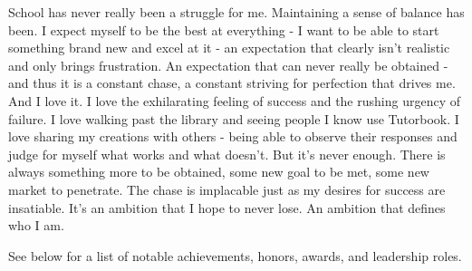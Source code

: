 \begin{cvparagraph}
School has never really been a struggle for me. Maintaining a sense of
	balance has been. I expect myself to be the best at everything - I want to be
	able to start something brand new and excel at it - an expectation that
	clearly isn't realistic and only brings frustration. An expectation that
	can never really be obtained - and thus it is a constant chase, a
	constant striving for perfection that drives me. And I love it. I love
	the exhilarating feeling of success and the rushing urgency of failure.
	I love walking past the library and seeing people I know use Tutorbook.
	I love sharing my creations with others - being able to observe their
	responses and judge for myself what works and what doesn't. But it's
	never enough. There is always something more to be obtained, some new
	goal to be met, some new market to penetrate. The chase is implacable
	just as my desires for success are insatiable. It's an ambition that I
	hope to never lose. An ambition that defines who I am.
\end{cvparagraph}
\begin{cvparagraph}
See below for a list of notable achievements, honors, awards, and leadership
	roles.
\end{cvparagraph}
